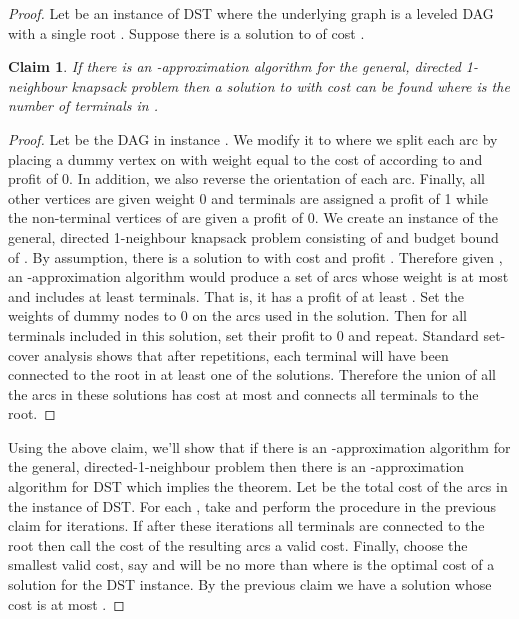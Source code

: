 \documentclass[12pt]{article}
\newtheorem{claim}[theorem]{Claim}
\newcommand{\DST}{{DST}\xspace}
\begin{document}
\begin{proof}
Let  be an instance of \DST where the underlying graph  is a leveled DAG with a single root .  Suppose there is a solution to  of cost .

\begin{claim} \label{claim:cover}
If there is an -approximation algorithm for
the general, directed 1-neighbour knapsack problem then a solution
to  with cost  can be found where 
is the number of terminals in .
\end{claim}

\begin{proof}
Let  be the DAG in instance .  We modify it to
 where we split each arc  by placing a dummy
vertex on  with weight equal to the cost of  according to 
and profit of 0.  In addition, we also reverse the orientation of each arc.
Finally, all other vertices are given weight 0 and terminals are assigned
a profit of 1 while the non-terminal vertices
of  are given a profit of 0.  We create an instance  of the
general, directed 1-neighbour knapsack problem consisting of 
and budget bound of .  By assumption, there is a solution to 
with cost  and profit .  Therefore given , an
-approximation algorithm would produce a set of arcs whose
weight is at most  and includes at least  terminals.
That is, it has a profit of at least .  Set the weights of
dummy nodes to 0 on the arcs used in the solution. Then for all
terminals included in this solution, set their profit to 0 and
repeat.  Standard set-cover analysis shows that after  repetitions, each terminal will have been connected to the root
in at least one of the solutions.  Therefore the union of all the
arcs in these solutions has cost at most 
and connects all terminals to the root.
\hfill  \end{proof}
Using the above claim, we'll show that if there is an -approximation algorithm for the general, directed-1-neighbour problem then there is an -approximation algorithm for \DST which implies the theorem.  Let  be the total cost of the arcs in the instance of \DST.  For
each , take  and perform the procedure in the previous claim for  iterations.  If after
these iterations all terminals are connected to the root then call
the cost of the resulting arcs a valid cost.  Finally, choose the
smallest valid cost, say  and  will be no more than
 where  is the optimal cost of a solution for
the \DST instance.  By the previous claim we have a solution
whose cost is at most .
\hfill  \end{proof}
\end{document}
